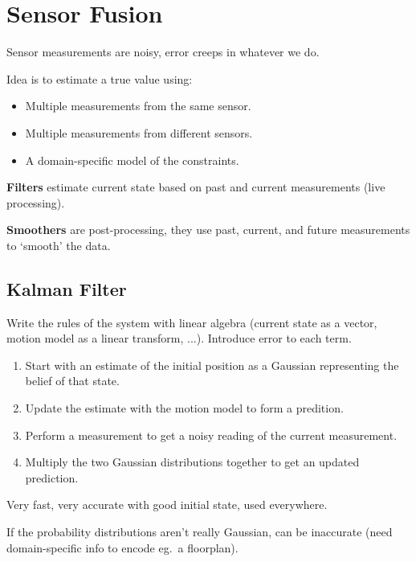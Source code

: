 \documentclass[a4paper, 11pt]{article}
\begin{document}
\section*{Sensor Fusion}
{
    Sensor measurements are noisy, error creeps in whatever we do.

    Idea is to estimate a true value using:
    \begin{itemize}
    \item Multiple measurements from the same sensor.
    \item Multiple measurements from different sensors.
    \item A domain-specific model of the constraints.
    \end{itemize}

    \textbf{Filters} estimate current state based on past and current measurements (live processing).

    \textbf{Smoothers} are post-processing, they use past, current, and future measurements to `smooth' the data.

    \subsection*{Kalman Filter}
    {
        Write the rules of the system with linear algebra (current state as a vector, motion model as a linear transform, ...). Introduce error to each term.

        \begin{enumerate}
        \item Start with an estimate of the initial position as a Gaussian representing the belief of that state.
        \item Update the estimate with the motion model to form a predition.
        \item Perform a measurement to get a noisy reading of the current measurement.
        \item Multiply the two Gaussian distributions together to get an updated prediction.
        \end{enumerate}

        Very fast, very accurate with good initial state, used everywhere.

        If the probability distributions aren't really Gaussian, can be inaccurate (need domain-specific info to encode eg.\ a floorplan).
    }
}
\end{document}
